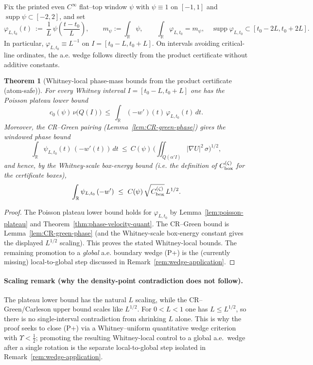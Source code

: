 \documentclass[11pt]{article}
\newtheorem{theorem}{Theorem}
\theoremstyle{definition}
\theoremstyle{remark}
\theoremstyle{definition}
\newcommand{\R}{\mathbb{R}}
\begin{document}
Fix the printed even $C^\infty$ flat--top window $\psi$ with $\psi\equiv 1$ on $[-1,1]$ and $\operatorname{supp}\psi\subset[-2,2]$, and set
\[
  \varphi_{L,t_0}(t)\ :=\ \frac{1}{L}\,\psi\!\left(\frac{t-t_0}{L}\right),\qquad
  m_\psi:=\int_\R\psi,\qquad \int_{\R}\!\varphi_{L,t_0}=m_\psi,\quad \operatorname{supp}\varphi_{L,t_0}\subset[t_0-2L,t_0+2L].
\]
In particular, $\varphi_{L,t_0}\equiv L^{-1}$ on $I=[t_0-L,t_0+L]$.
On intervals avoiding critical-line ordinates, the a.e. wedge follows directly from the product certificate without additive constants.
\begin{theorem}[Whitney-local phase-mass bounds from the product certificate (atom-safe)]\label{thm:psc-certificate-stage2}
For every Whitney interval $I=[t_0-L,t_0+L]$ one has the Poisson plateau lower bound
\[
  c_0(\psi)\,\nu\!\big(Q(I)\big)\ \le\ \int_{\R} (-w')(t)\,\varphi_{L,t_0}(t)\,dt.
\]
Moreover, the CR--Green pairing (Lemma~\ref{lem:CR-green-phase}) gives the windowed phase bound
\[
  \int_{\R}\psi_{L,t_0}(t)\,(-w'(t))\,dt\ \le\ C(\psi)\,\Big(\iint_{Q(\alpha'I)} |\nabla U|^2\,\sigma\Big)^{1/2},
\]
and hence, by the Whitney-scale box-energy bound (i.e. the definition of $C_{\rm box}^{(\zeta)}$ for the certificate boxes),
\[
  \int_{\R}\psi_{L,t_0}\,(-w')\ \le\ C(\psi)\,\sqrt{C_{\rm box}^{(\zeta)}}\,L^{1/2}.
\]
\end{theorem}
\begin{proof}
The Poisson plateau lower bound holds for $\varphi_{L,t_0}$ by Lemma~\ref{lem:poisson-plateau} and Theorem~\ref{thm:phase-velocity-quant}. The CR--Green bound is Lemma~\ref{lem:CR-green-phase} (and the Whitney-scale box-energy constant gives the displayed $L^{1/2}$ scaling). This proves the stated Whitney-local bounds. The remaining promotion to a \emph{global} a.e. boundary wedge \textup{(P+)} is the (currently missing) local-to-global step discussed in Remark~\ref{rem:wedge-application}.
\end{proof}

\paragraph{Scaling remark (why the density-point contradiction does not follow).}
The plateau lower bound has the natural $L$ scaling, while the CR--Green/Carleson upper bound scales like $L^{1/2}$. For $0<L<1$ one has $L\le L^{1/2}$, so there is no single-interval contradiction from shrinking $L$ alone. This is why the proof seeks to close \textup{(P+)} via a Whitney--uniform quantitative wedge criterion with $\Upsilon<\tfrac12$; promoting the resulting Whitney-local control to a global a.e.\ wedge after a single rotation is the separate local-to-global step isolated in Remark~\ref{rem:wedge-application}.
\end{document}
